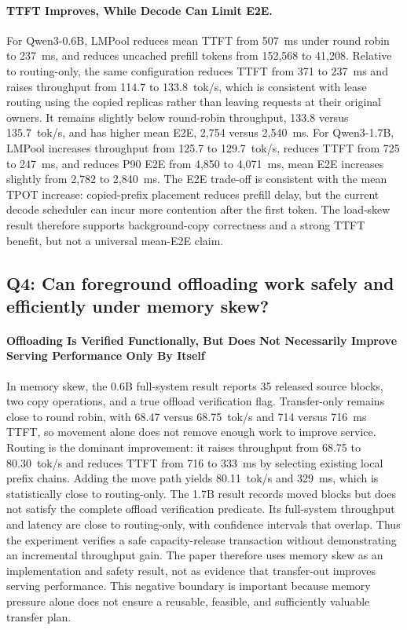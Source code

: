 \documentclass{article}
\newcommand{\sys}{LMPool}
\begin{document}
\paragraph{TTFT Improves, While Decode Can Limit E2E.} For Qwen3-0.6B, \sys{} reduces mean TTFT from 507~ms under round robin to 237~ms, and reduces uncached prefill tokens from 152,568 to 41,208. Relative to routing-only, the same configuration reduces TTFT from 371 to 237~ms and raises throughput from 114.7 to 133.8~tok/s, which is consistent with lease routing using the copied replicas rather than leaving requests at their original owners. It remains slightly below round-robin throughput, 133.8 versus 135.7~tok/s, and has higher mean E2E, 2,754 versus 2,540~ms. For Qwen3-1.7B, \sys{} increases throughput from 125.7 to 129.7~tok/s, reduces TTFT from 725 to 247~ms, and reduces P90 E2E from 4,850 to 4,071~ms, mean E2E increases slightly from 2,782 to 2,840~ms. The E2E trade-off is consistent with the mean TPOT increase: copied-prefix placement reduces prefill delay, but the current decode scheduler can incur more contention after the first token. The load-skew result therefore supports background-copy correctness and a strong TTFT benefit, but not a universal mean-E2E claim.

\subsection{Q4: Can foreground offloading work safely and efficiently under memory skew?}

\paragraph{Offloading Is Verified Functionally, But Does Not Necessarily Improve Serving Performance Only By Itself} In memory skew, the 0.6B full-system result reports 35 released source blocks, two copy operations, and a true offload verification flag. Transfer-only remains close to round robin, with 68.47 versus 68.75~tok/s and 714 versus 716~ms TTFT, so movement alone does not remove enough work to improve service. Routing is the dominant improvement: it raises throughput from 68.75 to 80.30~tok/s and reduces TTFT from 716 to 333~ms by selecting existing local prefix chains. Adding the move path yields 80.11~tok/s and 329~ms, which is statistically close to routing-only. The 1.7B result records moved blocks but does not satisfy the complete offload verification predicate. Its full-system throughput and latency are close to routing-only, with confidence intervals that overlap. Thus the experiment verifies a safe capacity-release transaction without demonstrating an incremental throughput gain. The paper therefore uses memory skew as an implementation and safety result, not as evidence that transfer-out improves serving performance. This negative boundary is important because memory pressure alone does not ensure a reusable, feasible, and sufficiently valuable transfer plan.
\end{document}
